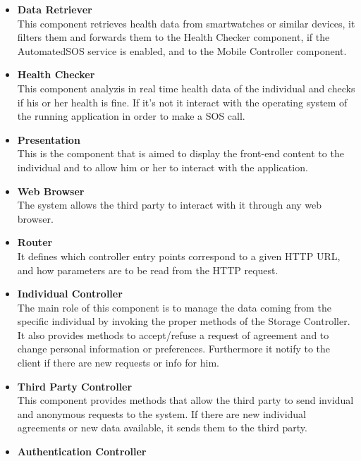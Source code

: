 \begin{legal}
\begin{itemize}
		\item{\textbf{Data Retriever}\\
		This component retrieves health data from smartwatches or similar devices, it filters them and forwards them to the Health Checker component, if the AutomatedSOS service is enabled, and to the Mobile Controller component.
				}\\
		\item{\textbf{Health Checker}\\
		This component analyzis in real time health data of the individual and checks if his or her health is fine. If it's not it interact with the operating system of the running application in order to make a SOS call.
				}\\
		\item{\textbf{Presentation}\\
		This is the component that is aimed to display the front-end content to the individual and to allow him or her to interact with the application.
				}\\
		\item{\textbf{Web Browser}\\
		The system allows the third party to interact with it through any web browser.
				}\\
		\item{\textbf{Router}\\
		It defines which controller entry points correspond to a given HTTP URL, and how parameters are to be read from the HTTP request.
				}\\
		\item{\textbf{Individual Controller}\\
		The main role of this component is to manage the data coming from the specific individual by invoking the proper methods of the Storage Controller. It also provides methods to accept/refuse a request of agreement and to change personal information or preferences. Furthermore it notify to the client if there are new requests or info for him.
				}\\
		\item{\textbf{Third Party Controller}\\
		This component provides methods that allow the third party to send invidual and anonymous requests to the system. If there are new individual agreements or new data available, it sends them to the third party.
				}\\
		\item{\textbf{Authentication Controller}\\
}
\end{itemize}
\end{legal}
